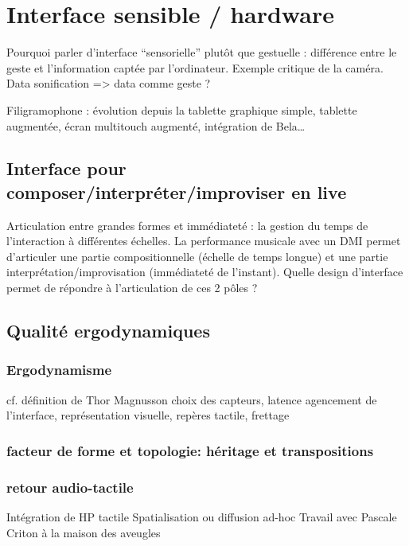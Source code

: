 %
\chapter{Interface sensible / hardware}
\label{ch:interfaces}


Pourquoi parler d’interface “sensorielle” plutôt que gestuelle : différence entre le geste et l’information captée par l’ordinateur. Exemple critique de la caméra. Data sonification => data comme geste ?

Filigramophone : évolution depuis la tablette graphique simple, tablette augmentée, écran multitouch augmenté, intégration de Bela…

\section{Interface pour composer/interpréter/improviser en live}
Articulation entre grandes formes et immédiateté : la gestion du temps de l’interaction à différentes échelles.
La performance musicale avec un DMI permet d’articuler une partie compositionnelle (échelle de temps longue) et une partie interprétation/improvisation (immédiateté de l’instant). 
Quelle design d’interface permet de répondre à l’articulation de ces 2 pôles ? 

\section{Qualité ergodynamiques}
\subsection{Ergodynamisme}
cf. définition de Thor Magnusson
choix des capteurs, latence
agencement de l’interface, représentation visuelle, repères tactile, frettage

\subsection{facteur de forme et topologie: héritage et transpositions}

\subsection{retour audio-tactile}
Intégration de HP tactile
Spatialisation ou diffusion ad-hoc
Travail avec Pascale Criton à la maison des aveugles


